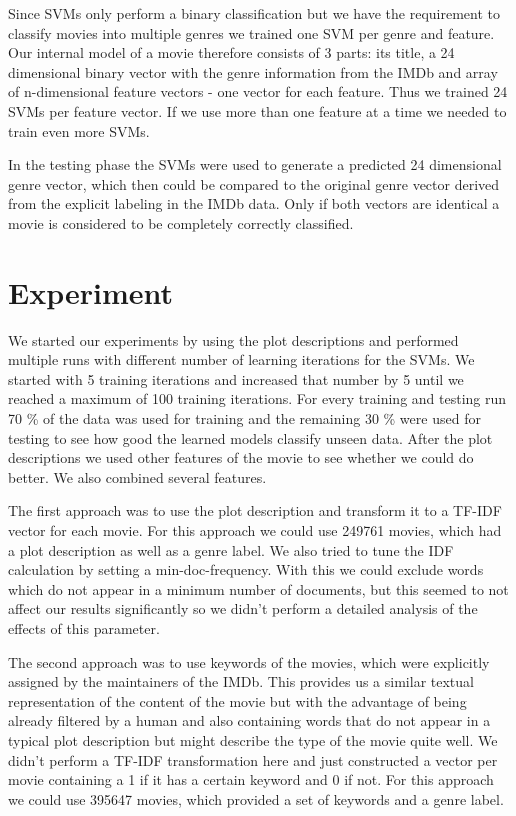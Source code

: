 \documentclass{vldb}
\begin{document}
\par Since SVMs only perform a binary classification but we have the requirement to classify movies into multiple genres we trained one SVM per genre and feature. Our internal model of a movie therefore consists of 3 parts: its title, a 24 dimensional binary vector with the genre information from the IMDb and array of n-dimensional feature vectors - one vector for each feature. Thus we trained 24 SVMs per feature vector. If we use more than one feature at a time we needed to train even more SVMs.
\par In the testing phase the SVMs were used to generate a predicted 24 dimensional genre vector, which then could be compared to the original genre vector derived from the explicit labeling in the IMDb data. Only if both vectors are identical a movie is considered to be completely correctly classified.

\section{Experiment}


\par We started our experiments by using the plot descriptions and performed multiple runs with different number of learning iterations for the SVMs. We started with 5 training iterations and increased that number by 5 until we reached a maximum of 100 training iterations. For every training and testing run 70 \% of the data was used for training and the remaining 30 \% were used for testing to see how good the learned models classify unseen data. After the plot descriptions we used other features of the movie to see whether we could do better. We also combined several features.

\par The first approach was to use the plot description and transform it to a TF-IDF vector for each movie. For this approach we could use 249761 movies, which had a plot description as well as a genre label. We also tried to tune the IDF calculation by setting a min-doc-frequency. With this we could exclude words which do not appear in a minimum number of documents, but this seemed to not affect our results significantly so we didn't perform a detailed analysis of the effects of this parameter.

\par The second approach was to use keywords of the movies, which were explicitly assigned by the maintainers of the IMDb. This provides us a similar textual representation of the content of the movie but with the advantage of being already filtered by a human and also containing words that do not appear in a typical plot description but might describe the type of  the movie quite well. We didn't perform a TF-IDF transformation here and just constructed a vector per movie containing a 1 if it has a certain keyword and 0 if not. For this approach we could use 395647 movies, which provided a set of keywords and a genre label.
\end{document}
